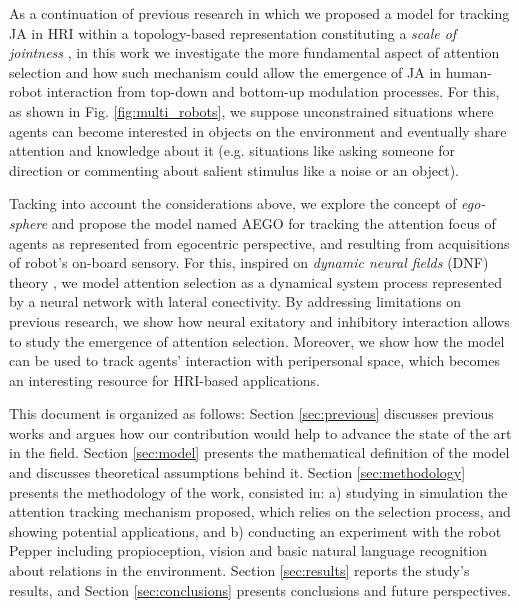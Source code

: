 \documentclass[letterpaper, 10 pt, conference]{ieeeconf}  %
\begin{document}
	As a continuation of previous research in which we proposed a model for tracking JA in HRI within a topology-based representation constituting a \textit{scale of jointness} \cite{chame2023top}, in this work we investigate the more fundamental aspect of attention selection and how such mechanism could allow the emergence of JA in human-robot interaction from top-down and bottom-up modulation processes. For this, as shown in Fig. \ref{fig:multi_robots}, we suppose unconstrained situations where agents can become interested in objects on the environment and eventually share attention and knowledge about it (e.g. situations like asking someone for direction or commenting about salient stimulus like a noise or an object). 
	
	Tacking into account the considerations above, we explore the concept of \textit{ego-sphere} \cite{albus1991} and propose the model named AEGO for tracking the attention focus of agents as represented from egocentric perspective, and resulting from acquisitions of robot's on-board sensory. For this, inspired on \textit{dynamic neural fields} (DNF) theory \cite{amari1977}, we model attention selection as a dynamical system process represented by a neural network with lateral conectivity. By addressing limitations on previous research, we show how neural exitatory and inhibitory interaction allows to study the emergence of attention selection. Moreover, we show how the model can be used to track agents' interaction with peripersonal space, which becomes an interesting resource for HRI-based applications. 
	
	  	  
	This document is organized as follows: Section \ref{sec:previous} discusses previous works and argues how our contribution would help to advance the state of the art in the field. Section \ref{sec:model} presents the mathematical definition of the model and discusses theoretical assumptions behind it. Section \ref{sec:methodology} presents the methodology of the work, consisted in: a) studying in simulation the attention tracking mechanism proposed, which relies on the selection process, and showing potential applications, and b) conducting an experiment with the robot Pepper including propioception, vision and basic natural language recognition about relations in the environment. Section \ref{sec:results} reports the study’s results, and Section \ref{sec:conclusions} presents conclusions and future perspectives.
	  
\end{document}
